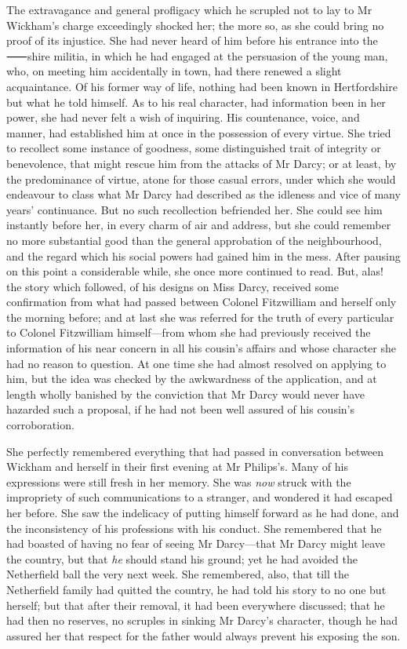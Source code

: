 The extravagance and general profligacy which he scrupled not to lay to Mr Wickham's charge exceedingly shocked her; the more so, as she could bring no proof of its injustice. She had never heard of him before his entrance into the ⸺shire militia, in which he had engaged at the persuasion of the young man, who, on meeting him accidentally in town, had there renewed a slight acquaintance. Of his former way of life, nothing had been known in Hertfordshire but what he told himself. As to his real character, had information been in her power, she had never felt a wish of inquiring. His countenance, voice, and manner, had established him at once in the possession of every virtue. She tried to recollect some instance of goodness, some distinguished trait of integrity or benevolence, that might rescue him from the attacks of Mr Darcy; or at least, by the predominance of virtue, atone for those casual errors, under which she would endeavour to class what Mr Darcy had described as the idleness and vice of many years' continuance. But no such recollection befriended her. She could see him instantly before her, in every charm of air and address, but she could remember no more substantial good than the general approbation of the neighbourhood, and the regard which his social powers had gained him in the mess. After pausing on this point a considerable while, she once more continued to read. But, alas! the story which followed, of his designs on Miss Darcy, received some confirmation from what had passed between Colonel Fitzwilliam and herself only the morning before; and at last she was referred for the truth of every particular to Colonel Fitzwilliam himself—from whom she had previously received the information of his near concern in all his cousin's affairs and whose character she had no reason to question. At one time she had almost resolved on applying to him, but the idea was checked by the awkwardness of the application, and at length wholly banished by the conviction that Mr Darcy would never have hazarded such a proposal, if he had not been well assured of his cousin's corroboration.

She perfectly remembered everything that had passed in conversation between Wickham and herself in their first evening at Mr Philips's. Many of his expressions were still fresh in her memory. She was \textit{now} struck with the impropriety of such communications to a stranger, and wondered it had escaped her before. She saw the indelicacy of putting himself forward as he had done, and the inconsistency of his professions with his conduct. She remembered that he had boasted of having no fear of seeing Mr Darcy—that Mr Darcy might leave the country, but that \textit{he} should stand his ground; yet he had avoided the Netherfield ball the very next week. She remembered, also, that till the Netherfield family had quitted the country, he had told his story to no one but herself; but that after their removal, it had been everywhere discussed; that he had then no reserves, no scruples in sinking Mr Darcy's character, though he had assured her that respect for the father would always prevent his exposing the son.

